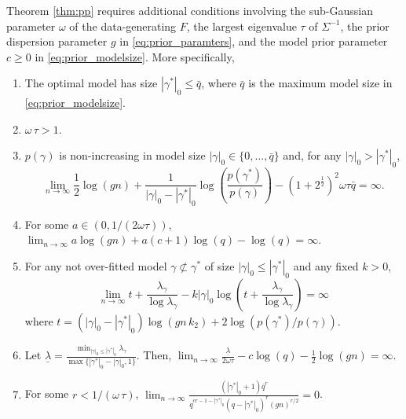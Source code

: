 Theorem \ref{thm:pp} requires additional conditions involving the sub-Gaussian parameter $\omega$ of the data-generating $F$, the largest eigenvalue $\tau$ of $\Sigma^{-1}$, the prior dispersion parameter $g$ in \eqref{eq:prior_paramters}, and the model prior parameter $c \geq 0$ in \eqref{eq:prior_modelsize}. More specifically, 

\begin{enumerate}[leftmargin=*,label=(B\arabic*)]
\item The optimal model has size $|\gamma^*|_0 \leq \bar{q}$, where $\bar{q}$ is the maximum model size in \eqref{eq:prior_modelsize}.

\item $\omega \, \tau >1$.

\item $p(\gamma)$ is non-increasing in model size $|\gamma|_0 \in \{0,\ldots,\bar{q}\}$ and, for any $|\gamma|_0 > |\gamma^*|_0$, 
$$\lim_{n \rightarrow \infty} \frac{1}{2}\log(g n) + \frac{1}{|\gamma|_0 - |\gamma^*|_0} \log \left( \frac{p(\gamma^*)}{p(\gamma)} \right) - (1+2^{\frac{1}{2}})^2 \omega \tau \bar{q} = \infty .$$


\item For some $a \in (0, 1/(2 \omega \tau))$,
$\lim_{n\rightarrow \infty} a \log(g n) + a (c + 1) \log(q) - \log(q) = \infty.$


\item For any not over-fitted model $\gamma \not\subset \gamma^*$ of size $|\gamma|_0 \leq |\gamma^*|_0$ and any fixed $k >0$,
$$
\lim_{n \rightarrow \infty} t + \frac{\lambda_\gamma}{\log \lambda_\gamma} - k |\gamma|_0 \log \left( t + \frac{\lambda_\gamma}{\log \lambda_\gamma} \right) = \infty
$$
where
$
 t= (|\gamma|_0 - |\gamma^*|_0) \log(g n \, k_2) + 2 \log \left( p(\gamma^*)/p(\gamma) \right).
$

\item Let $\underline{\lambda}= \frac{\min_{|\gamma|_0 \leq |\gamma^*|_0} \lambda_\gamma}{\max\{|\gamma^*|_0-|\gamma|_0,1\}}$. Then,
$\lim_{n \rightarrow \infty}
\frac{\underline{\lambda}}{2 \omega \tau} - c \log(q) - \frac{1}{2} \log(gn)= \infty.$

\item For some $r< 1/(\omega \, \tau)$,
$\lim_{n \rightarrow \infty} \frac{(|\gamma^*|_0+1) \bar{q}^r}{q^{cr-1-|\gamma^*|_0} (q - |\gamma^*|_0)^r (g n)^{r/2}}= 0$.
\end{enumerate}

